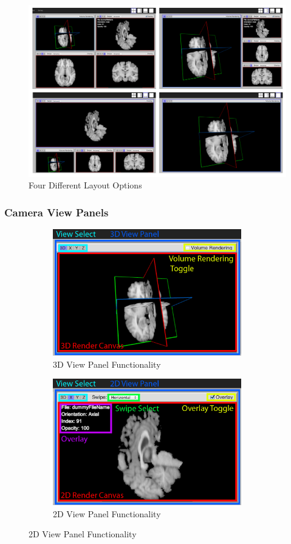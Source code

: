 \documentclass[a4paper,11pt,titlepage]{article}
\begin{document}
\begin{figure}[ht!]
\centering
\includegraphics[width=170mm]{graphics/layouts_01.png}
\caption{Four Different Layout Options}
\label{fig:UIdesign1}
\end{figure}


\subsubsection{Camera View Panels}

\begin{figure}
\centering
\begin{subfigure}{.5\textwidth}
  \centering
  \includegraphics[width=82mm]{graphics/features_02b.png}
  \caption{3D View Panel Functionality}
  \label{fig:sub1}
\end{subfigure}%
\begin{subfigure}{.5\textwidth}
  \centering
  \includegraphics[width=82mm]{graphics/features_02.png}
  \caption{2D View Panel Functionality}
  \label{fig:sub2}
\end{subfigure}
\end{figure}
\end{document}
